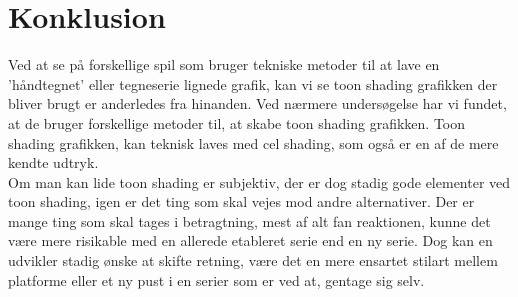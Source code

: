 \newpage
\section{Konklusion}
Ved at se på forskellige spil som bruger tekniske metoder til at lave en ’håndtegnet’ eller tegneserie lignede grafik, kan vi se toon shading grafikken der bliver brugt er anderledes fra hinanden. Ved nærmere undersøgelse har vi fundet, at de bruger forskellige metoder til, at skabe toon shading grafikken. Toon shading grafikken, kan teknisk laves med cel shading, som også er en af de mere kendte udtryk. 
\\
Om man kan lide toon shading er subjektiv, der er dog stadig gode elementer ved toon shading, igen er det ting som skal vejes mod andre alternativer. Der er mange ting som skal tages i betragtning, mest af alt fan reaktionen, kunne det være mere risikable med en allerede etableret serie end en ny serie. Dog kan en udvikler stadig ønske at skifte retning, være det en mere ensartet stilart mellem platforme eller et ny pust i en serier som er ved at, gentage sig selv.      